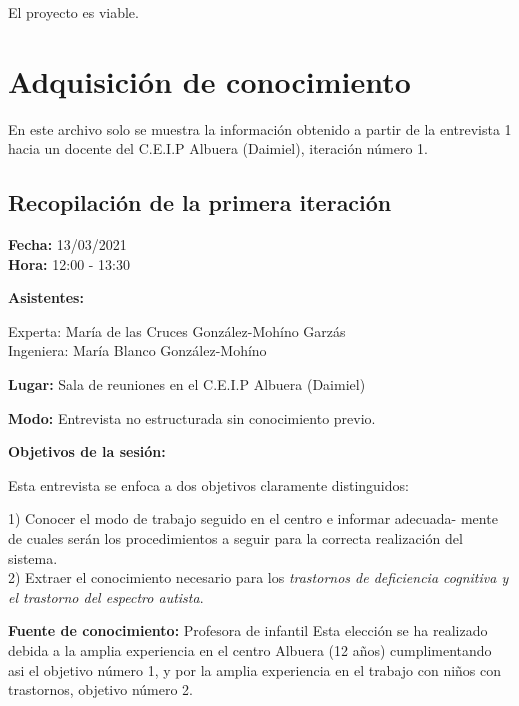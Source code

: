 \documentclass[letterpaper,12pt]{article}
\begin{document}
El proyecto es viable.\\
\newpage
\section{Adquisición de conocimiento}
	En este archivo solo se muestra la información obtenido a partir de la entrevista 1 hacia un docente del C.E.I.P Albuera (Daimiel), iteración número 1.
	
	\subsection{Recopilación de la primera iteración}
	\begin{flushleft}
	\textbf{Fecha: }13/03/2021 \\
	\textbf{Hora: }12:00 - 13:30 \\
	
	\end{flushleft} 
	\begin{flushleft}
	\textbf{Asistentes: } \\
	\end{flushleft}
	Experta: María de las Cruces González-Mohíno Garzás\\
	Ingeniera: María Blanco González-Mohíno
	
	\begin{flushleft}
	\textbf{Lugar:} Sala de reuniones en el C.E.I.P Albuera (Daimiel)
	\end{flushleft}
	\begin{flushleft}
	\textbf{Modo:} Entrevista no estructurada sin conocimiento previo.
	\end{flushleft}
	\begin{flushleft}
	\textbf{Objetivos de la sesión:}
	\end{flushleft}
	Esta entrevista se enfoca a dos objetivos claramente distinguidos: \\
	
	\begin{flushleft}
	1) Conocer el modo de trabajo seguido en el centro e informar adecuada-
mente de cuales serán los procedimientos a seguir para la correcta realización
del sistema. \\
	2) Extraer el conocimiento necesario para los \textit{trastornos de deficiencia
cognitiva y el trastorno del espectro autista}.
	\end{flushleft}
	
	\textbf{Fuente de conocimiento: }Profesora de infantil	
	Esta elección se ha realizado debida a la amplia experiencia en el centro Albuera (12 años) cumplimentando asi el objetivo número 1, y por la amplia
experiencia en el trabajo con niños con trastornos, objetivo número 2. \\
\end{document}
